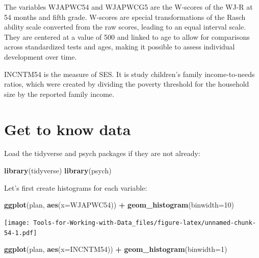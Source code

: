 \documentclass[
]{book}
\newenvironment{Shaded}{\begin{snugshade}}{\end{snugshade}}
\newcommand{\DataTypeTok}[1]{\textcolor[rgb]{0.13,0.29,0.53}{#1}}
\newcommand{\DecValTok}[1]{\textcolor[rgb]{0.00,0.00,0.81}{#1}}
\newcommand{\KeywordTok}[1]{\textcolor[rgb]{0.13,0.29,0.53}{\textbf{#1}}}
\newcommand{\NormalTok}[1]{#1}
\newcommand{\OperatorTok}[1]{\textcolor[rgb]{0.81,0.36,0.00}{\textbf{#1}}}
\newcommand{\StringTok}[1]{\textcolor[rgb]{0.31,0.60,0.02}{#1}}
\begin{document}
The variables WJAPWC54 and WJAPWCG5 are the W-scores of the WJ-R at 54 months and fifth grade. W-scores are special transformations of the Rasch ability scale converted from the raw scores, leading to an equal interval scale. They are centered at a value of 500 and linked to age to allow for comparisons across standardized tests and ages, making it possible to assess individual development over time.

INCNTM54 is the measure of SES. It is study children's family income-to-needs ratios, which were created by dividing the poverty threshold for the household size by the reported family income.

\hypertarget{get-to-know-data}{%
\section{Get to know data}\label{get-to-know-data}}

Load the tidyverse and psych packages if they are not already:

\begin{Shaded}
\begin{Highlighting}[]
\KeywordTok{library}\NormalTok{(tidyverse)}
\KeywordTok{library}\NormalTok{(psych)}
\end{Highlighting}
\end{Shaded}

Let's first create histograms for each variable:

\begin{Shaded}
\begin{Highlighting}[]
\KeywordTok{ggplot}\NormalTok{(plan, }\KeywordTok{aes}\NormalTok{(}\DataTypeTok{x=}\NormalTok{WJAPWC54)) }\OperatorTok{+}
\StringTok{  }\KeywordTok{geom_histogram}\NormalTok{(}\DataTypeTok{binwidth=}\DecValTok{10}\NormalTok{)}
\end{Highlighting}
\end{Shaded}

\texttt{[image: Tools-for-Working-with-Data\_files/figure-latex/unnamed-chunk-54-1.pdf]}

\begin{Shaded}
\begin{Highlighting}[]
\KeywordTok{ggplot}\NormalTok{(plan, }\KeywordTok{aes}\NormalTok{(}\DataTypeTok{x=}\NormalTok{INCNTM54)) }\OperatorTok{+}
\StringTok{  }\KeywordTok{geom_histogram}\NormalTok{(}\DataTypeTok{binwidth=}\DecValTok{1}\NormalTok{)}
\end{Highlighting}
\end{Shaded}
\end{document}
